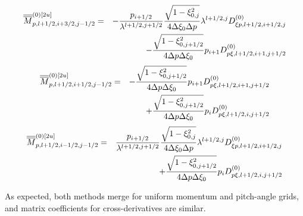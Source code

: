 \begin{eqnarray}
\overline{\overline{M}}_{p,l+1/2,i+3/2,j-1/2}^{\left( 0\right) \left[ 2u%
\right] } &=&-\frac{p_{i+1/2}}{\lambda ^{l+1/2,j+1/2}}\frac{\sqrt{1-\xi
_{0,j}^{2}}}{4\Delta \xi _{0}\Delta p}\lambda ^{l+1/2,j}D_{\xi
p,l+1/2,i+1/2,j}^{\left( 0\right) }  \notag \\
&&-\frac{\sqrt{1-\xi _{0,j+1/2}^{2}}}{4\Delta p\Delta \xi _{0}}%
p_{i+1}D_{p\xi ,l+1/2,i+1,j+1/2}^{\left( 0\right) }
\end{eqnarray}%
\begin{eqnarray}
\overline{\overline{M}}_{p,l+1/2,i+1/2,j-1/2}^{\left( 0\right) \left[ 2u%
\right] } &=&-\frac{\sqrt{1-\xi _{0,j+1/2}^{2}}}{4\Delta p\Delta \xi _{0}}%
p_{i+1}D_{p\xi ,l+1/2,i+1,j+1/2}^{\left( 0\right) }  \notag \\
&&+\frac{\sqrt{1-\xi _{0,j+1/2}^{2}}}{4\Delta p\Delta \xi _{0}}p_{i}D_{p\xi
,l+1/2,i,j+1/2}^{\left( 0\right) }
\end{eqnarray}%
\begin{eqnarray}
\overline{\overline{M}}_{p,l+1/2,i-1/2,j-1/2}^{\left( 0\right) \left[ 2u%
\right] } &=&\frac{p_{i+1/2}}{\lambda ^{l+1/2,j+1/2}}\frac{\sqrt{1-\xi
_{0,j}^{2}}}{4\Delta \xi _{0}\Delta p}\lambda ^{l+1/2,j}D_{\xi
p,l+1/2,i+1/2,j}^{\left( 0\right) }  \notag \\
&&+\frac{\sqrt{1-\xi _{0,j+1/2}^{2}}}{4\Delta p\Delta \xi _{0}}p_{i}D_{p\xi
,l+1/2,i,j+1/2}^{\left( 0\right) }
\end{eqnarray}

As expected, both methods merge for uniform momentum and pitch-angle grids,
and matrix coefficients for cross-derivatives are similar.
